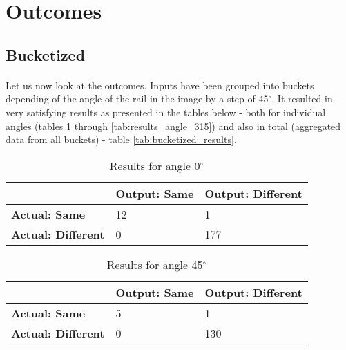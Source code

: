 \section{Outcomes}
\subsection{Bucketized}
\paragraph{}
Let us now look at the outcomes. Inputs have been grouped into buckets depending of the angle of the rail in the image by a step of 45$^{\circ}$. It resulted in very satisfying results as presented in the tables below - both for individual angles (tables \ref{tab:results_angle_0} through \ref{tab:results_angle_315}) and also in total (aggregated data from all buckets) - table \ref{tab:bucketized_results}.


\begin{table}[H]
    \centering
	\begin{spacing}{1.5}    
    \begin{tabular}{|l|l|l|}
        \hline
        \cellcolor{gray} & \textbf{Output: Same} & \textbf{Output: Different} \\ [0.5ex]
        \hline\hline
        \textbf{Actual: Same} & 12 & 1 \\ [0.5ex]
        \hline
        \textbf{Actual: Different} & 0 & 177 \\ [0.5ex]
        \hline
    \end{tabular}
    \end{spacing}
    \caption{Results for angle 0$^{\circ}$}
    \label{tab:results_angle_0}
\end{table}
            
\begin{table}[H]
    \centering
	\begin{spacing}{1.5}    
    \begin{tabular}{|l|l|l|}
        \hline
        \cellcolor{gray} & \textbf{Output: Same} & \textbf{Output: Different} \\ [0.5ex]
        \hline\hline
        \textbf{Actual: Same} & 5 & 1 \\ [0.5ex]
        \hline
        \textbf{Actual: Different} & 0 & 130 \\ [0.5ex]
        \hline
    \end{tabular}
    \end{spacing}
    \caption{Results for angle 45$^{\circ}$}
\end{table}
            
